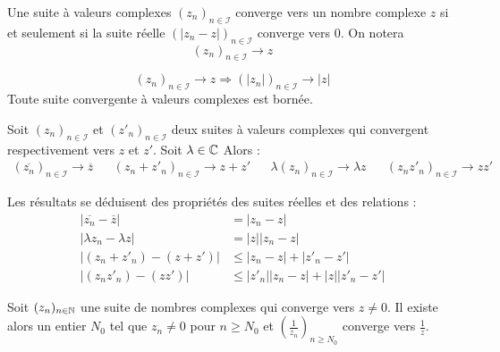 \begin{defi}
 Une suite à valeurs complexes $(z_n)_{n\in \mathcal I}$ converge vers un nombre complexe $z$ si et seulement si la suite réelle $(|z_n-z|)_{n\in \mathcal I}$ converge vers $0$. On notera 
\begin{displaymath}
 (z_n)_{n\in \mathcal I} \rightarrow z 
\end{displaymath}
\end{defi}

\begin{prop}
\begin{displaymath}
 (z_n)_{n\in \mathcal I} \rightarrow z \Rightarrow (|z_n|)_{n\in \mathcal I} \rightarrow |z|
\end{displaymath}
Toute suite convergente à valeurs complexes est bornée.
\end{prop}

\begin{prop}
 Soit $(z_n)_{n\in \mathcal I}$ et $(z'_n)_{n\in \mathcal I}$ deux suites à valeurs complexes qui convergent respectivement vers $z$ et $z'$. Soit $\lambda\in \mathbb{C}$  Alors :
\begin{align*}
 (\overline{z_n})_{n\in \mathcal I}\rightarrow \overline{z} & &
(z_n+z'_n)_{n\in \mathcal I} \rightarrow z+z'  & &
\lambda(z_n)_{n\in \mathcal I} \rightarrow \lambda z & &
(z_nz'_n)_{n\in \mathcal I} \rightarrow zz'
\end{align*}
\end{prop}
\begin{demo}
 Les résultats se déduisent des propriétés des suites réelles et des relations :
\begin{align*}
 |\overline{z_n} - \overline{z}| &= |z_n -z | \\
|\lambda z_n -\lambda z | &=|z||z_n -z |\\
|(z_n+z'_n)-(z+z')| &\leq |z_n -z | + |z'_n -z '|\\
|(z_nz'_n)-(zz')| &\leq |z'_n||z_n -z | + |z||z'_n -z '|
\end{align*}
\end{demo}
\begin{prop}
Soit $(z_n)_{n\in \mathbb{N}}$ une suite de nombres complexes qui converge vers $z\neq 0$. Il existe alors un entier $N_0$ tel que $z_n \neq 0$ pour $n\geq N_0$ et $(\frac{1}{z_n})_{n\geq N_0}$ converge vers $\frac{1}{z}$.
\end{prop}

